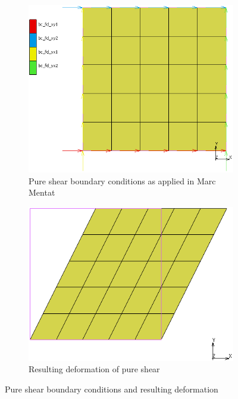 \begin{figure}[H]
	\centering
	\begin{subfigure}[b]{0.4\textwidth}
		\centering
		\includegraphics[width=\textwidth]{C3BC.png}
		\caption{Pure shear boundary conditions as applied in Marc Mentat}
		\label{fig:c3bc}
	\end{subfigure}
	\hfill
	\begin{subfigure}[b]{0.45\textwidth}
		\centering
		\includegraphics[width=\textwidth]{C3Def.png}
		\caption{Resulting deformation of pure shear}
		\label{fig:c3def}
	\end{subfigure}
	\caption[Pure shear boundary conditions and deformation]{Pure shear boundary conditions and resulting deformation}
	\label{fig:c3}
\end{figure}

